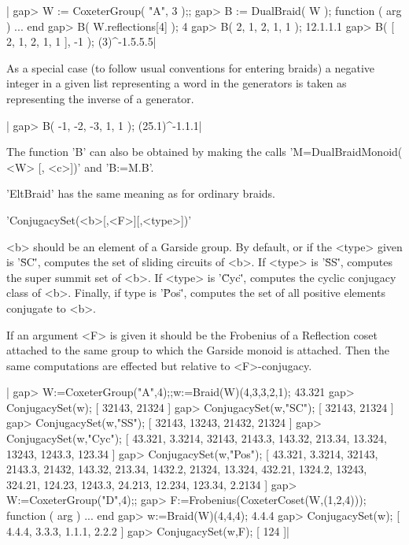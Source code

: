 |    gap> W := CoxeterGroup( "A", 3 );;
    gap> B := DualBraid( W );
    function ( arg ) ... end
    gap> B( W.reflections[4] );
    4
    gap> B( 2, 1, 2, 1, 1 );
    12.1.1.1
    gap> B( [ 2, 1, 2, 1, 1 ], -1 );
    (3)^-1.5.5.5|

As  a  special  case  (to  follow  usual conventions for entering braids) a
negative  integer in a given list representing  a word in the generators is
taken as representing the inverse of a generator.

|    gap> B( -1, -2, -3, 1, 1 );
    (25.1)^-1.1.1|

The function 'B' can also be obtained by making the calls
'M\:=DualBraidMonoid( <W> [, <c>])' and 'B:=M.B'.


'EltBraid'  has the  same  meaning as  for ordinary braids.



'ConjugacySet(<b>[,<F>][,<type>])'

<b>  should be an element of a Garside  group. By default, or if the <type>
given  is '\"SC\"', computes the set of  sliding circuits of <b>. If <type>
is  '\"SS\"', computes the super summit set of <b>. If <type> is '\"Cyc\"',
computes  the cyclic conjugacy class of <b>. Finally, if type is '\"Pos\"',
computes the set of all positive elements conjugate to <b>.

If  an argument  <F> is  given it  should be  the Frobenius of a Reflection
coset  attached to the same group to  which the Garside monoid is attached.
Then the same computations are effected but relative to <F>-conjugacy.

|    gap> W:=CoxeterGroup("A",4);;w:=Braid(W)(4,3,3,2,1);
    43.321
    gap> ConjugacySet(w);
    [ 32143, 21324 ]
    gap> ConjugacySet(w,"SC");
    [ 32143, 21324 ]
    gap> ConjugacySet(w,"SS");
    [ 32143, 13243, 21432, 21324 ]
    gap> ConjugacySet(w,"Cyc");
    [ 43.321, 3.3214, 32143, 2143.3, 143.32, 213.34, 13.324, 13243,
      1243.3, 123.34 ]
    gap> ConjugacySet(w,"Pos");
    [ 43.321, 3.3214, 32143, 2143.3, 21432, 143.32, 213.34, 1432.2,
      21324, 13.324, 432.21, 1324.2, 13243, 324.21, 124.23, 1243.3,
      24.213, 12.234, 123.34, 2.2134 ]
    gap> W:=CoxeterGroup("D",4);;
    gap> F:=Frobenius(CoxeterCoset(W,(1,2,4)));
    function ( arg ) ... end
    gap> w:=Braid(W)(4,4,4);
    4.4.4
    gap> ConjugacySet(w);
    [ 4.4.4, 3.3.3, 1.1.1, 2.2.2 ]
    gap> ConjugacySet(w,F);
    [ 124 ]|

